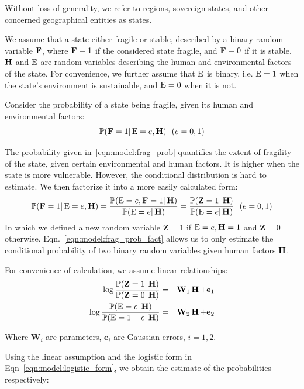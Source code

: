 Without loss of generality, we refer to regions, sovereign states, and other concerned geographical entities as states.

We assume that a state either fragile or stable, described by a binary random variable $\operatorname*{\mathbf{F}}$, where $\operatorname*{\mathbf{F}}=1$ if the considered state fragile, and $\operatorname*{\mathbf{F}}=0$ if it is stable. $\operatorname*{\mathbf{H}}$ and $\operatorname*{E}$ are random variables describing the human and environmental factors of the state. For convenience, we further assume that $\operatorname*{E}$ is binary, i.e. $\operatorname*{E}=1$ when the state's environment is sustainable, and $\operatorname*{E}=0$ when it is not. 

Consider the probability of a state being fragile, given its human and environmental factors:
\begin{equation}
    \mathbb P{(\operatorname*{\mathbf{F}}=1|\operatorname*{E}=e, \operatorname*{\mathbf{H}})} \ \ (e=0,1)
\label{eqn:model:frag_prob}
\end{equation}

The probability given in~\ref{eqn:model:frag_prob} quantifies the extent of fragility of the state, given certain environmental and human factors. It is higher when the state is more vulnerable. However, the conditional distribution is hard to estimate. We then factorize it into a more easily calculated form: 
\begin{equation}
    \mathbb P(\operatorname*{\mathbf{F}}=1|\operatorname*{E}=e,\operatorname*{\mathbf{H}})= \frac{\mathbb P(\operatorname*{E}=e, \operatorname*{\mathbf{F}}=1 | \operatorname*{\mathbf{H}})}{\mathbb P(\operatorname*{E}=e | \operatorname*{\mathbf{H}})} = \frac{\mathbb P(\mathbf{Z}=1|\operatorname*{\mathbf{H}})}{\mathbb P(\operatorname*{E}=e|\operatorname*{\mathbf{H}})}\ \ (e = 0,1)
    \label{eqn:model:frag_prob_fact}
\end{equation}
In which we defined a new random variable $\mathbf{Z}=1$ if $\operatorname*{E}=e,\operatorname*{\mathbf{H}}=1$ and $\mathbf{Z}=0$ otherwise.
Eqn.~\ref{eqn:model:frag_prob_fact} allows us to only estimate the conditional probability of two binary random variables given human factors $\operatorname*{\mathbf{H}}$.

For convenience of calculation, we assume linear relationships: 
\begin{eqnarray}
   \log\frac{\mathbb P(\mathbf{Z}=1|\operatorname*{\mathbf{H}})}{\mathbb P(\mathbf{Z}=0|\operatorname*{\mathbf{H}})} & = & \mathbf{W}_1\operatorname*{\mathbf{H}} + \mathbf{e}_1 \nonumber \\
   \log\frac{\mathbb P(\mathbf{\operatorname*{E}}=e|\operatorname*{\mathbf{H}})}{\mathbb P(\mathbf{\operatorname*{E}}=1-e|\operatorname*{\mathbf{H}})} & = & \mathbf{W}_2\operatorname*{\mathbf{H}} + \mathbf{e}_2 
   \label{eqn:model:logistic_form}
\end{eqnarray}

Where $\mathbf{W}_i$ are parameters, $\mathbf{e}_i$ are Gaussian errors, $i=1,2$.

Using the linear assumption and the logistic form in Eqn~\ref{eqn:model:logistic_form}, we obtain the estimate of the probabilities respectively:

